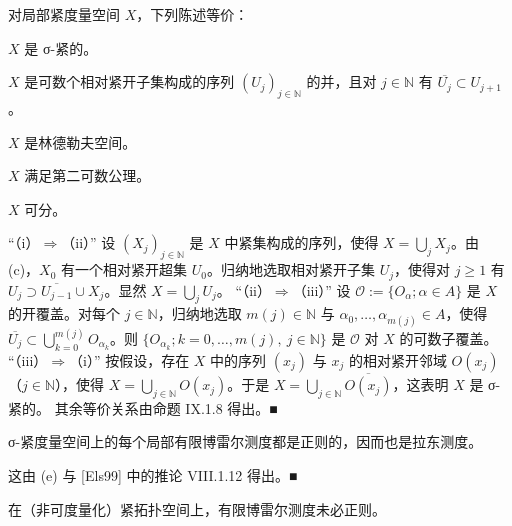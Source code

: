 \begin{remark}
\begin{items}
对局部紧度量空间 $ X $，下列陈述等价：

\begin{subitems}
\item

$ X $ 是 σ-紧的。

\item

$ X $ 是可数个相对紧开子集构成的序列 $ (U_j)_{j\in\mathbb{N}} $ 的并，且对 $ j \in \mathbb{N} $ 有 $ \overline{U_j} \subset U_{j+1} $。

\item

$ X $ 是林德勒夫空间。

\item

$ X $ 满足第二可数公理。

\item

$ X $ 可分。

\proofhead
“（i）$ \Rightarrow $（ii）” 设 $ (X_j)_{j\in\mathbb{N}} $ 是 $ X $ 中紧集构成的序列，使得 $ X = \bigcup_j X_j $。由 (c)，$ X_0 $ 有一个相对紧开超集 $ U_0 $。归纳地选取相对紧开子集 $ U_j $，使得对 $ j \ge 1 $ 有 $ U_j \supset \overline{U_{j-1}} \cup X_j $。显然 $ X = \bigcup_j U_j $。
“（ii）$ \Rightarrow $（iii）” 设 $ \mathcal{O} := \{ O_\alpha ; \alpha \in A \} $ 是 $ X $ 的开覆盖。对每个 $ j \in \mathbb{N} $，归纳地选取 $ m(j) \in \mathbb{N} $ 与 $ \alpha_0,\ldots,\alpha_{m(j)} \in A $，使得 $ \overline{U_j} \subset \bigcup_{k=0}^{m(j)} O_{\alpha_k} $。则 $ \{ O_{\alpha_k} ; k = 0,\ldots,m(j),\ j \in \mathbb{N} \} $ 是 $ \mathcal{O} $ 对 $ X $ 的可数子覆盖。
“（iii）$ \Rightarrow $（i）” 按假设，存在 $ X $ 中的序列 $ (x_j) $ 与 $ x_j $ 的相对紧开邻域 $ O(x_j) $（$ j \in \mathbb{N} $），使得 $ X = \bigcup_{j\in\mathbb{N}} O(x_j) $。于是 $ X = \bigcup_{j\in\mathbb{N}} \overline{O(x_j)} $，这表明 $ X $ 是 σ-紧的。
其余等价关系由命题 IX.1.8 得出。\nobreak\hspace{0.35em}■
\end{subitems}

\item

σ-紧度量空间上的每个局部有限博雷尔测度都是正则的，因而也是拉东测度。

\proofhead
这由 (e) 与 [Els99] 中的推论 VIII.1.12 得出。\nobreak\hspace{0.35em}■
\item

在（非可度量化）紧拓扑空间上，有限博雷尔测度未必正则。


\end{items}
\end{remark}
